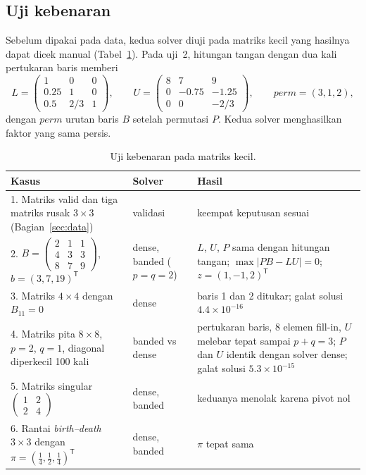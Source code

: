 \documentclass[12pt,a4paper]{article}
\newcommand{\T}{\mathsf{T}}
\numberwithin{equation}{section}
\begin{document}
\subsection{Uji kebenaran}
Sebelum dipakai pada data, kedua solver diuji pada matriks kecil yang hasilnya dapat dicek manual
(Tabel~\ref{tab:uji}). Pada uji~2, hitungan tangan dengan dua kali pertukaran baris memberi
\[
L=\begin{pmatrix}1&0&0\\0.25&1&0\\0.5&2/3&1\end{pmatrix},\qquad
U=\begin{pmatrix}8&7&9\\0&-0.75&-1.25\\0&0&-2/3\end{pmatrix},\qquad
\mathit{perm}=(3,1,2),
\]
dengan $\mathit{perm}$ urutan baris $B$ setelah permutasi $P$. Kedua solver menghasilkan faktor yang sama persis.

\begin{table}[H]
\centering
\caption{Uji kebenaran pada matriks kecil.}
\label{tab:uji}
\small
\begin{tabular}{@{}>{\raggedright}p{}>{\raggedright}p{}>{\raggedright\arraybackslash}p{}@{}}
\toprule
Kasus & Solver & Hasil\\
\midrule
1. Matriks valid dan tiga matriks rusak $3\times3$ (Bagian~\ref{sec:data}) & validasi & keempat keputusan sesuai\\
2. $B=\left(\begin{smallmatrix}2&1&1\\4&3&3\\8&7&9\end{smallmatrix}\right)$, $b=(3,7,19)^\T$
   & dense, banded ($p=q=2$) & $L$, $U$, $P$ sama dengan hitungan tangan; $\max\lvert PB-LU\rvert=0$;
   $z=(1,-1,2)^\T$\\
3. Matriks $4\times4$ dengan $B_{11}=0$ & dense & baris 1 dan 2 ditukar; galat solusi $4.4\times10^{-16}$\\
4. Matriks pita $8\times8$, $p=2$, $q=1$, diagonal diperkecil 100 kali & banded vs dense & 7 pertukaran baris,
   8 elemen fill-in, $U$ melebar tepat sampai $p+q=3$; $P$ dan $U$ identik dengan solver dense;
   galat solusi $5.3\times10^{-15}$\\
5. Matriks singular $\left(\begin{smallmatrix}1&2\\2&4\end{smallmatrix}\right)$ & dense, banded &
   keduanya menolak karena pivot nol\\
6. Rantai \emph{birth--death} $3\times3$ dengan $\pi=(\tfrac14,\tfrac12,\tfrac14)^\T$ & dense, banded &
   $\pi$ tepat sama\\
\bottomrule
\end{tabular}
\end{table}
\end{document}
